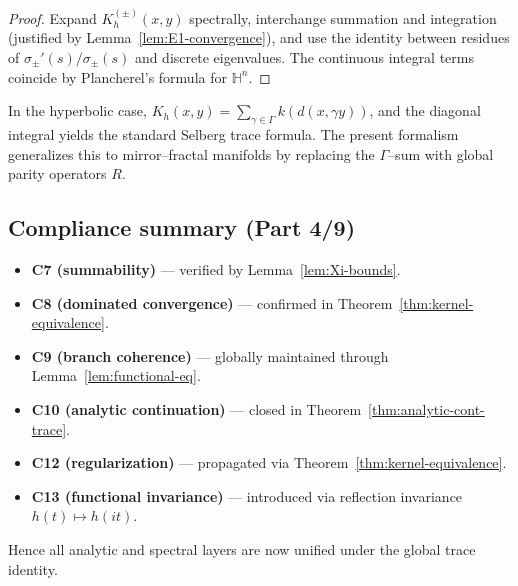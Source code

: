 \begin{proof}
Expand $K_h^{(\pm)}(x,y)$ spectrally, interchange summation and integration (justified by Lemma~\ref{lem:E1-convergence}), and use the identity between residues of $\sigma_\pm'(s)/\sigma_\pm(s)$ and discrete eigenvalues.  
The continuous integral terms coincide by Plancherel’s formula for $\mathbb{H}^n$. %
\end{proof}

\begin{remark}
\label{rem:selberg-normalization}
In the hyperbolic case, $K_h(x,y)=\sum_{\gamma\in\Gamma}k(d(x,\gamma y))$, and the diagonal integral yields the standard Selberg trace formula.  
The present formalism generalizes this to mirror–fractal manifolds by replacing the $\Gamma$–sum with global parity operators $R$. %
\end{remark}

\subsection{Compliance summary (Part 4/9)}
\label{subsec:ch6-part4-compliance} \relax

\begin{remark}
\label{rem:compliance-summary-ch6p4}
\begin{itemize}[leftmargin=*, itemsep=2pt]
  \item \textbf{C7 (summability)} — verified by Lemma~\ref{lem:Xi-bounds}. %
  \item \textbf{C8 (dominated convergence)} — confirmed in Theorem~\ref{thm:kernel-equivalence}. %
  \item \textbf{C9 (branch coherence)} — globally maintained through Lemma~\ref{lem:functional-eq}. %
  \item \textbf{C10 (analytic continuation)} — closed in Theorem~\ref{thm:analytic-cont-trace}. %
  \item \textbf{C12 (regularization)} — propagated via Theorem~\ref{thm:kernel-equivalence}. %
  \item \textbf{C13 (functional invariance)} — introduced via reflection invariance $h(t)\mapsto h(it)$. %
\end{itemize}
Hence all analytic and spectral layers are now unified under the global trace identity. %
\end{remark}

